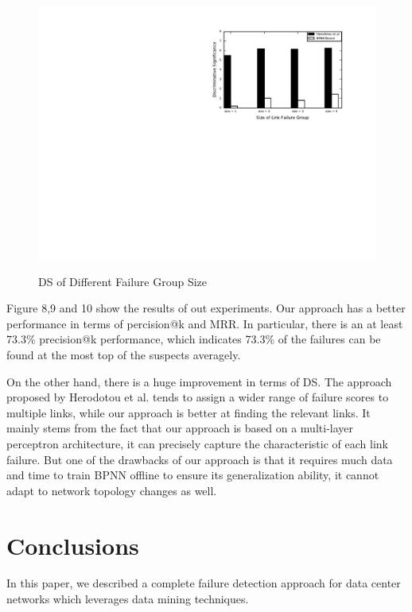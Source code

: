\documentclass{sig-alternate-05-2015}
\begin{document}
\begin{figure}
  \centering
  \includegraphics[scale=0.7]{ds} \\
  \caption{DS of Different Failure Group Size}
\end{figure}

Figure 8,9 and 10 show the results of out experiments. Our approach has a better performance in terms of percision@k and MRR. In particular, there is an at least 73.3\% precision@k performance, which indicates 73.3\% of the failures can be found at the most top of the suspects averagely.

On the other hand, there is a huge improvement in terms of DS. The approach proposed by Herodotou et al. tends to assign a wider range of failure scores to multiple links, while our approach is better at finding the relevant links. It mainly stems from the fact that our approach is based on a multi-layer perceptron architecture, it can precisely capture the characteristic of each link failure. But one of the drawbacks of our approach is that it requires much data and time to train BPNN offline to ensure its generalization ability, it cannot adapt to network topology changes as well.





\section{Conclusions}
In this paper, we described a complete failure detection approach for data center networks which leverages data mining techniques. 
\end{document}
